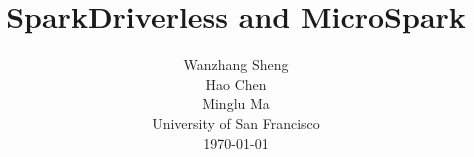 \documentclass[twocolumn]{article}
\title{SparkDriverless and MicroSpark}
\author{Wanzhang Sheng \\
Hao Chen \\
Minglu Ma \\
University of San Francisco\\
\today \\
}
\begin{document}
\maketitle











\small


\end{document}
